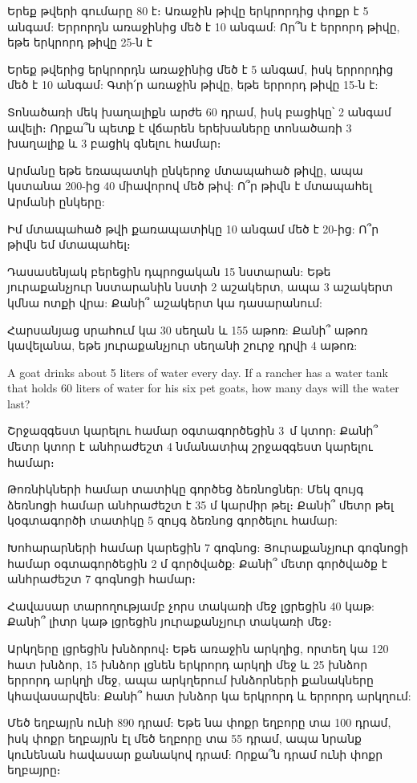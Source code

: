 \problem
Երեք թվերի գումարը 80 է։ Առաջին թիվը երկրորդից փոքր 
է 5 անգամ: Երրորդն առա\-ջինից մեծ է 10 անգամ: Որ՞ն է 
երրորդ թիվը, եթե երկրորդ թիվը 25-ն է

\problem
Երեք թվերից երկրորդն առաջինից մեծ է 5 անգամ, իսկ 
երրորդից մեծ է 10 անգամ: Գտի՛ր առաջին թիվը, եթե 
երրորդ թիվը 15-ն է:

\problem
Տոնածառի մեկ խաղալիքն արժե 60 դրամ, իսկ բացիկը՝ 2 
անգամ ավելի։ Որքա՞ն պետք է վճարեն երեխաները տոնածառի 
3 խաղալիք և 3 բացիկ գնելու համար։

\problem
Արմանը եթե եռապատկի ընկերոջ մտապահած թիվը, ապա կստանա 
200-ից 40 միավորով մեծ թիվ: Ո՞ր թիվն է մտապահել Արմանի 
ընկերը:

\problem
Իմ մտապահած թվի քառապատիկը 10 անգամ մեծ է 20-ից: Ո՞ր 
թիվն եմ մտապահել։

\problem
Դասասենյակ բերեցին դպրոցական 15 նստարան: Եթե յուրաքանչյուր 
նստարանին նստի 2 աշակերտ, ապա 3 աշակերտ կմնա ոտքի վրա: 
Քանի՞ աշակերտ կա դասարանում:

\problem
Հարսանյաց սրահում կա 30 սեղան և 155 աթոռ: Քանի՞ աթոռ 
կավելանա, եթե յուրաքանչյուր սեղանի շուրջ դրվի 4 աթոռ:

\problem
A goat drinks about 5 liters of water every day. If a 
rancher has a water tank that holds 60 liters of water 
for his six pet goats, how many days will the water last?

\problem
Շրջազգեստ կարելու համար օգտագործեցին 3~մ կտոր: Քանի՞ 
մետր կտոր է անհրաժեշտ 4 նմանատիպ շրջազգեստ կարելու համար։

\problem
Թոռնիկների համար տատիկը գործեց ձեռնոցներ: Մեկ զույգ 
ձեռնոցի համար անհրաժեշտ է 35 մ կարմիր թել։ Քանի՞ մետր 
թել կօգտագործի տատիկը 5 զույգ ձեռնոց գործելու համար:

\problem
Խոհարարների համար կարեցին 7 գոգնոց: Յուրաքանչյուր 
գոգնոցի համար օգտագործեցին 2 մ գործվածք: Քանի՞ մետր 
գործվածք է անհրաժեշտ 7 գոգնոցի համար։

\problem
Հավասար տարողությամբ չորս տակառի մեջ լցրեցին 40 կաթ: 
Քանի՞ լիտր կաթ լցրեցին յուրաքանչյուր տակառի մեջ։

\problem
Արկղերը լցրեցին խնձորով։ Եթե առաջին արկղից, որտեղ կա 120 
հատ խնձոր, 15 խնձոր լցնեն երկրորդ արկղի մեջ և 25 խնձոր 
երրորդ արկղի մեջ, ապա արկղերում խնձորների քանակները 
կհավասարվեն: Քանի՞ հատ խնձոր կա երկրորդ և երրորդ արկղում:

\problem
Մեծ եղբայրն ունի 890 դրամ: Եթե նա փոքր եղբորը տա 100 դրամ, 
իսկ փոքր եղբայրն էլ մեծ եղբորը տա 55 դրամ, ապա նրանք կունենան 
հավասար քանակով դրամ: Որքա՞ն դրամ ունի փոքր եղբայրը։

